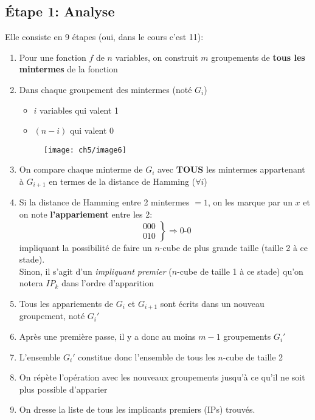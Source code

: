 \subsection{Étape 1: Analyse}
Elle consiste en 9 étapes (oui, dans le cours c'est 11):
\begin{enumerate}
	\item Pour une fonction $f$ de $n$ variables, on construit $m$ groupements de \textbf{tous les mintermes} de la fonction
	\item Dans chaque groupement des mintermes (noté $G_i$)
	\begin{itemize}
		\item $i$ variables qui valent 1
		\item $(n-i)$ qui valent 0
	\end{itemize}
	\begin{figure}[H]
		\centering
		\texttt{[image: ch5/image6]}
	\end{figure}
	\item On compare chaque minterme de $G_i$ avec \textbf{TOUS} les mintermes appartenant à $G_{i+1}$ en termes de la distance de Hamming ($\forall i$)
	\item Si la distance de Hamming entre 2 mintermes $=1$, on les marque par un $x$  et on note \textbf{l'appariement} entre les 2:
	\begin{equation}
		\left.
			\begin{array}{r}
				000\\
				010
			\end{array}
		\right\}\Rightarrow 0\text{-}0
	\end{equation}
	impliquant la possibilité de faire un $n$-cube de plus grande taille (taille 2 à ce stade).\\
	Sinon, il s'agit d'un \textit{impliquant premier} ($n$-cube de taille 1 à ce stade) qu'on notera $IP_k$ dans l'ordre d'apparition
	\item Tous les appariements de $G_i$ et $G_{i+1}$ sont écrits dans un nouveau groupement, noté $G_i'$
	\item Après une première passe, il y a donc au moins $m-1$ groupements $G_i'$
	\item L'ensemble $G_i'$ constitue donc l'ensemble de tous les $n$-cube de taille 2
	\item On répète l'opération avec les nouveaux groupements jusqu'à ce qu'il ne soit plus possible d'apparier
	\item On dresse la liste de tous les implicants premiers (IPs) trouvés.
\end{enumerate}
